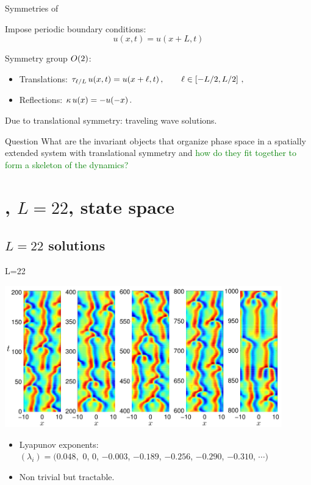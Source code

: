 \documentclass{beamer}
\begin{document}
\begin{frame}{Symmetries of \KSe}

Impose periodic boundary conditions:
\[
 u(x,t) = u(x+L,t)
\]

Symmetry group $O(2)$:
\begin{itemize}
 \item Translations: $\tau_{\ell/L}\, u(x,t) = u(x+\ell,t)\,,\qquad \ell\in\left[-L/2,L/2\right]\,,$
 \item Reflections:  $\kappa \, u(x) = -u(-x)\,.$
\end{itemize}

Due to translational symmetry: traveling wave solutions.

\begin{block}{Question}
What are the invariant objects that organize phase space in a spatially extended system
with translational symmetry and \textcolor{green}{how do they fit together to form a
skeleton of the dynamics?}
\end{block}

\end{frame}



\section[KSe, $L=22$]{\KS, $L=22$, state space }

\subsection{$L=22$ solutions}

\begin{frame}{L=22}
\begin{center}
  \includegraphics[width=0.9\textwidth,clip=true]{../../figs/ks_L22_long_orbit}
\end{center}

\begin{block}{}
 \begin{itemize}
  \item Lyapunov exponents: \\
	$(\lambda_i) = (0.048,$ 0, 0, $-0.003$, $-0.189$, $-0.256$, $-0.290$, $-0.310$, $\cdots)$
  \item Non trivial but tractable.	
 \end{itemize}

\end{block}

\end{frame}
\end{document}
